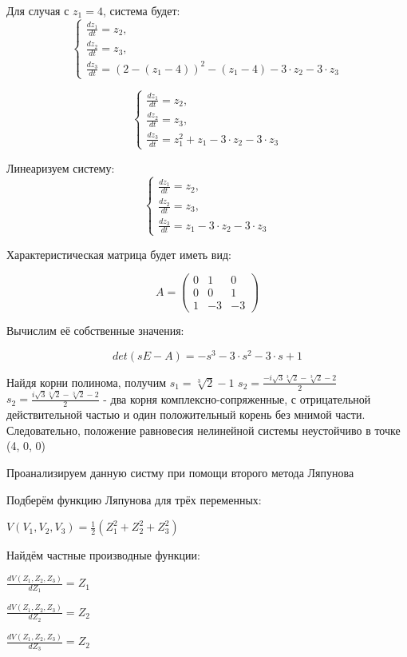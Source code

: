 Для случая с $z_1 = 4$, система будет:
$$
\begin{cases}
	\frac{dz_1}{dt} = z_2, \\
	\frac{dz_2}{dt} = z_3, \\
	\frac{dz_3}{dt} = (2 - (z_1 - 4))^2 - (z_1 - 4) - 3 \cdot z_2 - 3 \cdot z_3
\end{cases}
$$

$$
\begin{cases}
	\frac{dz_1}{dt} = z_2, \\
	\frac{dz_2}{dt} = z_3, \\
	\frac{dz_3}{dt} = z_1^2 + z_1 - 3 \cdot z_2 - 3 \cdot z_3
\end{cases}
$$

Линеаризуем систему:
$$
\begin{cases}
	\frac{dz_1}{dt} = z_2, \\
	\frac{dz_2}{dt} = z_3, \\
	\frac{dz_3}{dt} = z_1 - 3 \cdot z_2 - 3 \cdot z_3
\end{cases}
$$

Характеристическая матрица будет иметь вид:

$$
A = 
\begin{pmatrix}
	0 & 1 & 0 \\
	0 & 0 & 1 \\
	1 & -3 & -3
\end{pmatrix}
$$

Вычислим её собственные значения:

$$
det(sE - A) = -s^3-3 \cdot s^2-3 \cdot s+1
$$

Найдя корни полинома, получим $s_1 = \sqrt[3]2-1$ $s_2 = \frac{-i \sqrt{3} \sqrt[3]{2} - \sqrt[3]{2} - 2}{2}$ $s_2 = \frac{i \sqrt{3} \sqrt[3]{2} - \sqrt[3]{2} - 2}{2}$ - два корня комплексно-сопряженные,
с отрицательной действительной частью и один положительный корень без мнимой части.
Следовательно, положение равновесия нелинейной системы неустойчиво в точке (4, 0, 0)

Проанализируем данную систму при помощи второго метода Ляпунова

Подберём функцию Ляпунова для трёх переменных:

$
V(V_1,V_2,V_3)=\frac{1}{2}(Z_1^2+Z_2^2+Z_3^2)
$

Найдём частные производные функции:

$
\frac{dV(Z_1,Z_2,Z_3)}{dZ_1}=Z_1
$

$
\frac{dV(Z_1,Z_2,Z_3)}{dZ_2}=Z_2
$

$
\frac{dV(Z_1,Z_2,Z_3)}{dZ_3}=Z_2
$


